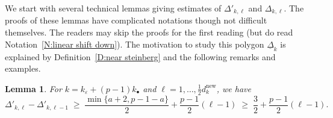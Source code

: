 \documentclass[12pt]{amsart}
\newtheorem{lemma}[subsection]{Lemma}
\theoremstyle{definition}
\numberwithin{equation}{subsection}
\newcommand{\new}{\mathrm{new}}
\begin{document}
We start with several technical lemmas giving estimates of $\Delta'_{k, \ell}$ and $\Delta_{k,\ell}$.  The proofs of these lemmas have complicated notations though not difficult themselves. The readers may skip the proofs for the first reading (but do read Notation~\ref{N:linear shift down}). The motivation to study this polygon $\underline \Delta_k$ is explained by Definition~\ref{D:near steinberg} and the following remarks and examples.
\begin{lemma}
\label{L:estimate Delta kell}
For $k =k_\varepsilon + (p-1)k_{\bullet}$ and $\ell = 1,\dots, \frac 12 d_{k}^\new$, we have
$$
\Delta'_{k, \ell} - \Delta'_{k, \ell-1}\;\geq\; \frac {\min\{a+2, p-1-a\}}2+ \frac {p-1}2 (\ell-1) \;\geq\;  \frac 32 + \frac {p-1}2(\ell-1).%
$$
\end{lemma}
\end{document}
